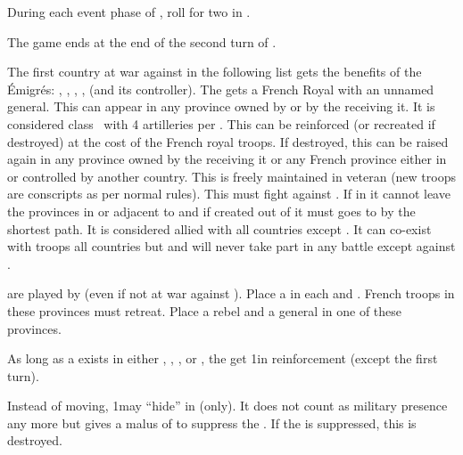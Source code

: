 \begin{digressions}
  \effetlong
  \aparag During each event phase of \monarqueTerror, roll for two \REVOLT in
  \FRA.

  \phpaix
   The game ends at the end of the second turn
  of \monarqueTerror.




  \phadm
  \aparag The first country at war against \FRA in the following list gets the
  benefits of the \'Emigr\'es: \AUS, \PRU, \HIS, \ENG, \payspologne (and its
  controller).
  \aparag The \MAJ gets a French Royal \ARMY\facemoins with an unnamed
  general.
  \bparag This \ARMY can appear in any province owned by \FRA or by the \MAJ
  receiving it.
  \bparag It is considered class \CAIII\ with 4 artilleries per
  \ARMY\faceplus.
  \aparag This \ARMY can be reinforced (or recreated if destroyed) at the cost
  of the French royal troops.
  \bparag If destroyed, this \ARMY can be raised again in any province owned
  by the \MAJ receiving it or any French province either in \REVOLT or
  controlled by another country.
  \aparag This \ARMY is freely maintained in veteran (new troops are
  conscripts as per normal rules).
  \aparag This \ARMY must fight against \FRA. If in \FRA it cannot leave the
  provinces in or adjacent to \FRA and if created out of \FRA it must goes to
  \FRA by the shortest path. It is considered allied with all countries except
  \FRA. It can co-exist with troops all countries but \FRA and will never take
  part in any battle except against \FRA.



  \phdipl
  \aparag {} are played by \ENG (even if not at war against
  \FRA).
  \aparag Place a \REVOLT \facemoins in each \provincePoitou and
  \provinceVendee.
  \bparag French troops in these provinces must retreat.
  \aparag Place a rebel \ARMY\faceplus and a general in one of these
  provinces.

  \phadm
  \aparag As long as a \REVOLT exists in either \provincePoitou,
  \provinceVendee, \provinceMorbihan, \provinceArmor or \provinceFinistere,
  the  get 1\LD in reinforcement (except the first turn).

  \phmil
  \aparag Instead of moving, 1\LD may ``hide'' in \provinceVendee (only). It
  does not count as military presence any more but gives a malus of 
  to suppress the \REVOLT .
  \bparag If the \REVOLT is suppressed, this \LD is destroyed.



\end{digressions}
